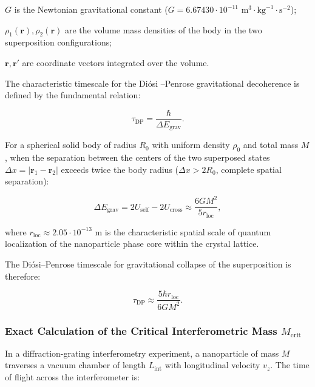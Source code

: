 $G$ is the Newtonian gravitational constant ($G = 6.67430 \cdot 10^{-11}\text{ m}^3\cdot\text{kg}^{-1}\cdot\text{s}^{-2}$);  

$\rho_1(\mathbf{r}), \rho_2(\mathbf{r})$ are the volume mass densities of the body in the two superposition configurations;  

$\mathbf{r}, \mathbf{r}'$ are coordinate vectors integrated over the volume.

The characteristic timescale for the Diósi \cite{ref40}--Penrose \cite{ref41} gravitational decoherence is defined by the fundamental relation:

\begin{equation}\label{eq:5.35}\tag{5.35}
\tau_{\text{DP}} = \frac{\hbar}{\Delta E_{\text{grav}}}.
\end{equation}

For a spherical solid body of radius $R_0$ with uniform density $\rho_0$ and total mass $M$, when the separation between the centers of the two superposed states $\Delta x = |\mathbf{r}_1 - \mathbf{r}_2|$ exceeds twice the body radius ($\Delta x > 2 R_0$, complete spatial separation):

\begin{equation}\label{eq:5.36}\tag{5.36}
\Delta E_{\text{grav}} = 2 U_{\text{self}} - 2 U_{\text{cross}} \approx \frac{6 G M^2}{5 r_{\text{loc}}},
\end{equation}

where $r_{\text{loc}} \approx 2.05 \cdot 10^{-13}\text{ m}$ is the characteristic spatial scale of quantum localization of the nanoparticle phase core within the crystal lattice.

The Diósi--Penrose timescale for gravitational collapse of the superposition is therefore:

\begin{equation}\label{eq:5.37}\tag{5.37}
\tau_{\text{DP}} \approx \frac{5 \hbar r_{\text{loc}}}{6 G M^2}.
\end{equation}

\subsubsection{Exact Calculation of the Critical Interferometric Mass $M_{\text{crit}}$}\label{sec:5.2.3}

In a diffraction-grating interferometry experiment, a nanoparticle of mass $M$ traverses a vacuum chamber of length $L_{\text{int}}$ with longitudinal velocity $v_z$. The time of flight across the interferometer is:

